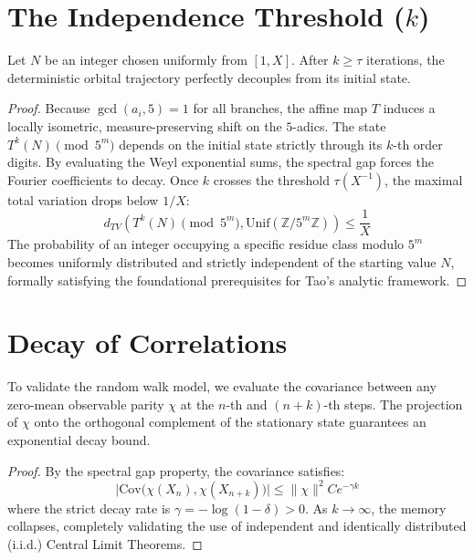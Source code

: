 \section{The Independence Threshold ($k$)}

\begin{theorem}
\leanok
Let $N$ be an integer chosen uniformly from $[1, X]$. After $k \ge \tau$ iterations, the deterministic orbital trajectory perfectly decouples from its initial state.
\end{theorem}
\begin{proof}
Because $\gcd(a_i, 5) = 1$ for all branches, the affine map $T$ induces a locally isometric, measure-preserving shift on the $5$-adics. The state $T^k(N) \pmod{5^m}$ depends on the initial state strictly through its $k$-th order digits. By evaluating the Weyl exponential sums, the spectral gap forces the Fourier coefficients to decay. Once $k$ crosses the threshold $\tau(X^{-1})$, the maximal total variation drops below $1/X$:
$$ d_{TV}\left( T^k(N) \pmod{5^m}, \text{Unif}(\mathbb{Z}/5^m\mathbb{Z}) \right) \le \frac{1}{X} $$
The probability of an integer occupying a specific residue class modulo $5^m$ becomes uniformly distributed and strictly independent of the starting value $N$, formally satisfying the foundational prerequisites for Tao's analytic framework.
\end{proof}

\section{Decay of Correlations}

\begin{theorem}
\leanok
To validate the random walk model, we evaluate the covariance between any zero-mean observable parity $\chi$ at the $n$-th and $(n+k)$-th steps. The projection of $\chi$ onto the orthogonal complement of the stationary state guarantees an exponential decay bound.
\end{theorem}
\begin{proof}
By the spectral gap property, the covariance satisfies:
$$ \big| \text{Cov}\big(\chi(X_n), \chi(X_{n+k})\big) \big| \le \|\chi\|^2 C e^{-\gamma k} $$
where the strict decay rate is $\gamma = -\log(1-\delta) > 0$. As $k \to \infty$, the memory collapses, completely validating the use of independent and identically distributed (i.i.d.) Central Limit Theorems.
\end{proof}

